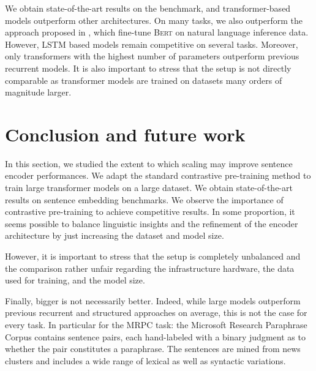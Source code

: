 We obtain state-of-the-art results on the benchmark, and transformer-based models outperform other architectures. On many tasks, we also outperform the approach proposed in \textcite{reimers_19}, which fine-tune \textsc{Bert} on natural language inference data. However, LSTM based models remain competitive on several tasks. Moreover, only transformers with the highest number of parameters outperform previous recurrent models. It is also important to stress that the setup is not directly comparable as transformer models are trained on datasets many orders of magnitude larger.

\section{Conclusion and future work}



In this section, we studied the extent to which scaling may improve sentence encoder performances. We adapt the standard contrastive pre-training method to train large transformer models on a large dataset. We obtain state-of-the-art results on sentence embedding benchmarks. We observe the importance of contrastive pre-training to achieve competitive results. In some proportion, it seems possible to balance linguistic insights and the refinement of the encoder architecture by just increasing the dataset and model size. 

However, it is important to stress that the setup is completely unbalanced and the comparison rather unfair regarding the infrastructure hardware, the data used for training, and the model size.

Finally, bigger is not necessarily better. Indeed, while large models outperform previous recurrent and structured approaches on average, this is not the case for every task. In particular for the MRPC task: the Microsoft Research Paraphrase Corpus contains  sentence pairs, each hand-labeled with a binary judgment as to whether the pair constitutes a paraphrase. The sentences are mined from news clusters and includes a wide range of lexical as well as syntactic variations.


\setlength\tabcolsep{6pt} %
